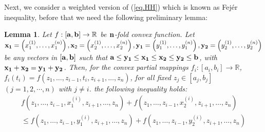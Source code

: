 \documentclass{amsart}
\theoremstyle{plain}
\newtheorem{lemma}{Lemma}
\numberwithin{equation}{section}
\begin{document}
Next, we consider a weighted version of (\ref{eq.HH}) which is
known as Fej\'{e}r inequality, before that we need the following
preliminary lemma:
\begin{lemma}\label{lemma}
Let $ f:\left[ {{\bf{a}},{\bf{b}}} \right]  \to \mathbb{R} $ be
${\bf{n}}$-fold convex function. Let ${\bf{x}}_{\bf{1}} = \left(
{x_1^{\left( 1 \right)} , \ldots ,x_1^{\left( n \right)} }
\right),{\bf{x}}_2 = \left( {x_2^{\left( 1 \right)} , \ldots
,x_2^{\left( n \right)} } \right) , {\bf{y}}_{\bf{1}} = \left(
{y_1^{\left( 1 \right)} , \ldots ,y_1^{\left( n \right)} }
\right),{\bf{y}}_{\bf{2}}= \left( {y_2^{\left( 1 \right)} , \ldots
,y_2^{\left( n \right)} } \right) $ be any vectors in $\left[
{{\bf{a}},{\bf{b}}} \right] $ such that $ {\bf{a}} \le {\bf{y_1}}
\le {\bf{x_1}} \le {\bf{x_2}} \le {\bf{y_2}}  \le {\bf{b}} $, with
${\bf{x}}_{\bf{1}} + {\bf{x}}_{\bf{2}}  = {\bf{y}}_{\bf{1}}  +
{\bf{y}}_{\bf{2}}$. Then, for the convex partial mappings $ f_i
:\left[ {a_i,b_i} \right] \to \mathbb{R}$, $ f_i \left( {t_i}
 \right) =
f\left( {z_1 , \ldots ,z_{i - 1} ,t_i ,z_{i + 1} , \ldots ,z_n }
\right) $,  for all fixed $ z_j \in \left[ {a_j,b_j} \right] $
$(j=1,2,\cdots,n)$ with $j\ne i$.  the following inequality holds:
\begin{multline}
\label{eq2.15}f\left( {z_1 , \ldots ,z_{i - 1} ,x_1^{\left( i
\right)} ,z_{i + 1} , \ldots ,z_n } \right) + f\left( {z_1 ,
\ldots ,z_{i - 1} ,x_2^{\left( i \right)} ,z_{i + 1} , \ldots ,z_n
} \right)
\\
\le f\left( {z_1 , \ldots ,z_{i - 1} ,y_1^{\left( i \right)} ,z_{i
+ 1} , \ldots ,z_n } \right) + f\left( {z_1 , \ldots ,z_{i - 1}
,y_2^{\left( i \right)} ,z_{i + 1} , \ldots ,z_n } \right)
\end{multline}
\end{lemma}
\end{document}
